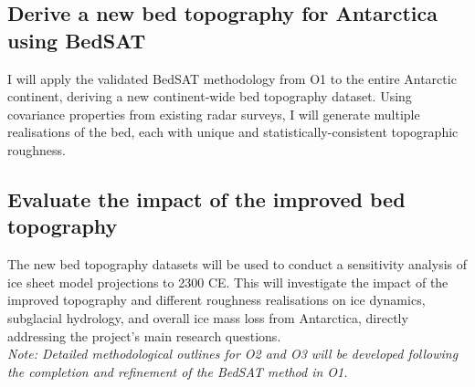 \subsection{Derive a new bed topography for Antarctica using BedSAT}
I will apply the validated BedSAT methodology from O1 to the entire Antarctic continent, deriving a new continent-wide bed topography dataset. Using covariance properties from existing radar surveys, I will generate multiple realisations of the bed, each with unique and statistically-consistent topographic roughness.

\subsection{Evaluate the impact of the improved bed topography}
The new bed topography datasets will be used to conduct a sensitivity analysis of ice sheet model projections to 2300 CE. This will investigate the impact of the improved topography and different roughness realisations on ice dynamics, subglacial hydrology, and overall ice mass loss from Antarctica, directly addressing the project's main research questions.
\\
\textit{Note: Detailed methodological outlines for O2 and O3 will be developed following the completion and refinement of the BedSAT method in O1.}



